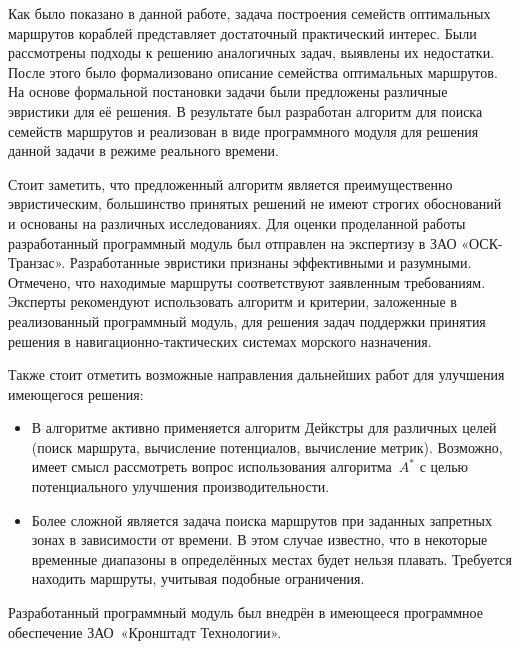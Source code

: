 \startconclusionpage

Как было показано в данной работе, задача построения семейств
оптимальных маршрутов кораблей представляет достаточный практический
интерес. Были рассмотрены подходы к решению аналогичных задач,
выявлены их недостатки. После этого было формализовано описание
семейства оптимальных маршрутов. На основе формальной постановки
задачи были предложены различные эвристики для её решения. В
результате был разработан алгоритм для поиска семейств маршрутов и
реализован в виде программного модуля для решения данной задачи в
режиме реального времени.

Стоит заметить, что предложенный алгоритм является преимущественно
эвристическим, большинство принятых решений не имеют строгих
обоснований и основаны на различных исследованиях. Для оценки
проделанной работы разработанный программный модуль был отправлен на
экспертизу в ЗАО «ОСК-Транзас». Разработанные эвристики признаны
эффективными и разумными. Отмечено, что находимые маршруты
соответствуют заявленным требованиям. Эксперты рекомендуют
использовать алгоритм и критерии, заложенные в реализованный
программный модуль, для решения задач поддержки принятия решения в
навигационно-тактических системах морского назначения.

Также стоит отметить возможные направления дальнейших работ для
улучшения имеющегося решения:
\begin{itemize}
    \item В алгоритме активно применяется алгоритм Дейкстры для различных
      целей (поиск маршрута, вычисление потенциалов, вычисление метрик).
      Возможно, имеет смысл рассмотреть вопрос использования
      алгоритма~$A^*$ с целью потенциального улучшения производительности.
    \item Более сложной является задача поиска маршрутов при заданных
      запретных зонах в зависимости от времени. В этом случае
      известно, что в некоторые временные диапазоны в определённых
      местах будет нельзя плавать. Требуется находить маршруты,
      учитывая подобные ограничения.
\end{itemize}

Разработанный программный модуль был внедрён в имеющееся программное
обеспечение ЗАО~«Кронштадт Технологии».

\FloatBarrier

